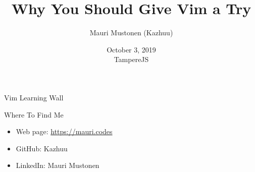 \documentclass{beamer}
\title{Why You Should Give Vim a Try}
\author{Mauri Mustonen (Kazhuu)}
\date{October 3, 2019 \\ TampereJS}
\begin{document}
\maketitle

\begin{frame}{Vim Learning Wall}
\end{frame}

\begin{frame}{Where To Find Me}
    \begin{itemize}
        \item Web page: \url{https://mauri.codes}
        \item GitHub: Kazhuu
        \item LinkedIn: Mauri Mustonen
    \end{itemize}
\end{frame}
\usebackgroundtemplate{}
\end{document}
